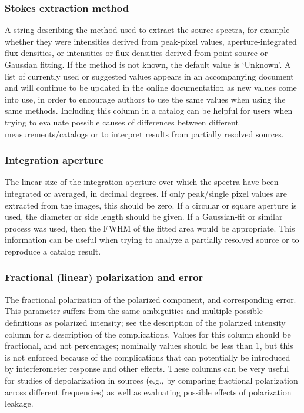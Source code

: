 \documentclass[10pt,modern]{aastex63}
\begin{document}
\subsubsection{Stokes extraction method}
A string describing the method used to extract the source spectra, for example whether they were intensities derived from peak-pixel values, aperture-integrated flux densities, or intensities or flux densities derived from point-source or Gaussian fitting. If the method is not known, the default value is `Unknown'. A list of currently used or suggested values appears in an accompanying document and will continue to be updated in the online documentation as new values come into use, in order to encourage authors to use the same values when using the same methods. Including this column in a catalog can be helpful for users when trying to evaluate possible causes of differences between different measurements/catalogs or to interpret results from partially resolved sources.

\subsubsection{Integration aperture}
The linear size of the integration aperture over which the spectra have been integrated or averaged, in decimal degrees. If only peak/single pixel values are extracted from the images, this should be zero. If a circular or square aperture is used, the diameter or side length should be given. If a Gaussian-fit or similar process was used, then the FWHM of the fitted area would be appropriate. This information can be useful when trying to analyze a partially resolved source or to reproduce a catalog result.


\subsubsection{Fractional (linear) polarization and error}
The fractional polarization of the polarized component, and corresponding error. This parameter suffers from the same ambiguities and multiple possible definitions as polarized intensity; see the description of the polarized intensity column for a description of the complications. Values for this column should be fractional, and not percentages; nominally values should be less than 1, but this is not enforced because of the complications that can potentially be introduced by interferometer response and other effects. These columns can be very useful for studies of depolarization in sources (e.g., by comparing fractional polarization across different frequencies) as well as evaluating possible effects of polarization leakage.
\end{document}
